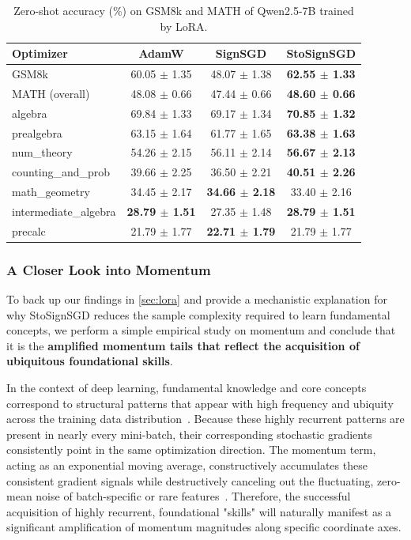 \documentclass{article}
\begin{document}
\begin{table}[htbp]
    \centering
    \caption{Zero-shot accuracy (\%) on GSM8k and MATH of Qwen2.5-7B trained by LoRA.}
    \label{tab:lora}
    \begin{tabular}{lccc}
        \toprule
        \textbf{Optimizer} & \textbf{AdamW} &\textbf{SignSGD} &  \textbf{StoSignSGD} \\
        \midrule      
        GSM8k & 60.05 \(\pm\) 1.35 & 48.07 \(\pm\) 1.38 & \textbf{62.55 \(\pm\) 1.33} \\\midrule
        MATH (overall)         & 48.08 $\pm$ 0.66 & 47.44 $\pm$ 0.66 & \textbf{48.60 $\pm$ 0.66} \\
        \midrule
        algebra                & 69.84 $\pm$ 1.33 & 69.17 $\pm$ 1.34 & \textbf{70.85 $\pm$ 1.32} \\
        prealgebra             & 63.15 $\pm$ 1.64 & 61.77 $\pm$ 1.65 & \textbf{63.38 $\pm$ 1.63} \\
        num\_theory            & 54.26 $\pm$ 2.15 & 56.11 $\pm$ 2.14 & \textbf{56.67 $\pm$ 2.13} \\
        counting\_and\_prob    & 39.66 $\pm$ 2.25 & 36.50 $\pm$ 2.21 & \textbf{40.51 $\pm$ 2.26} \\
        math\_geometry         & 34.45 $\pm$ 2.17 & \textbf{34.66 $\pm$ 2.18} & 33.40 $\pm$ 2.16 \\
        intermediate\_algebra  & \textbf{28.79 $\pm$ 1.51} & 27.35 $\pm$ 1.48 & \textbf{28.79 $\pm$ 1.51} \\
        precalc                & 21.79 $\pm$ 1.77 & \textbf{22.71 $\pm$ 1.79} & 21.79 $\pm$ 1.77 \\
        \bottomrule
    \end{tabular}
\end{table}

\subsubsection{A Closer Look into Momentum}
To back up our findings in \cref{sec:lora} and provide a mechanistic explanation for why StoSignSGD reduces the sample complexity required to learn fundamental concepts, we perform a simple empirical study on momentum and conclude that it is the \textbf{amplified momentum tails that reflect the acquisition of ubiquitous foundational skills}. 

In the context of deep learning, fundamental knowledge and core concepts correspond to structural patterns that appear with high frequency and ubiquity across the training data distribution~\citep{arpit2017closer, shah2020pitfalls}. Because these highly recurrent patterns are present in nearly every mini-batch, their corresponding stochastic gradients consistently point in the same optimization direction. The momentum term, acting as an exponential moving average, constructively accumulates these consistent gradient signals while destructively canceling out the fluctuating, zero-mean noise of batch-specific or rare features~\citep{sutskever2013momentum}. Therefore, the successful acquisition of highly recurrent, foundational "skills" will naturally manifest as a significant amplification of momentum magnitudes along specific coordinate axes.
\end{document}
